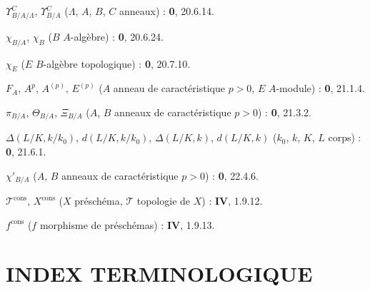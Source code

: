 \clearpage
{}
$\Upsilon^C_{B/A/\Lambda}$, $\Upsilon^C_{B/A}$ ($\Lambda$, $A$, $B$, $C$ anneaux) : \textbf{0}, 20.6.14.\par
$\chi_{B/A}$, $\chi_B$ ($B$ $A$-algèbre) : \textbf{0}, 20.6.24.\par
$\chi_E$ ($E$ $B$-algèbre topologique) : \textbf{0}, 20.7.10.\par
$F_A$, $A^p$, $A^{(p)}$, $E^{(p)}$ ($A$ anneau de caractéristique $p>0$, $E$ $A$-module) : \textbf{0}, 21.1.4.\par
$\pi_{B/A}$, $\Theta_{B/A}$, $\Xi_{B/A}$ ($A$, $B$ anneaux de caractéristique $p>0$) : \textbf{0}, 21.3.2.\par
$\Delta(L/K,k/k_0)$, $d(L/K,k/k_0)$, $\Delta(L/K,k)$, $d(L/K,k)$ ($k_0$, $k$, $K$, $L$ corps) : \textbf{0}, 21.6.1.\par
$\chi'_{B/A}$ ($A$, $B$ anneaux de caractéristique $p>0$) : \textbf{0}, 22.4.6.\par
$\mathscr T^{\mathrm{cons}}$, $X^{\mathrm{cons}}$ ($X$ préschéma, $\mathscr T$ topologie de $X$) : \textbf{IV}, 1.9.12.\par
$f^{\mathrm{cons}}$ ($f$ morphisme de préschémas) : \textbf{IV}, 1.9.13.\par

\clearpage
{}
{}
\section*{INDEX TERMINOLOGIQUE}

